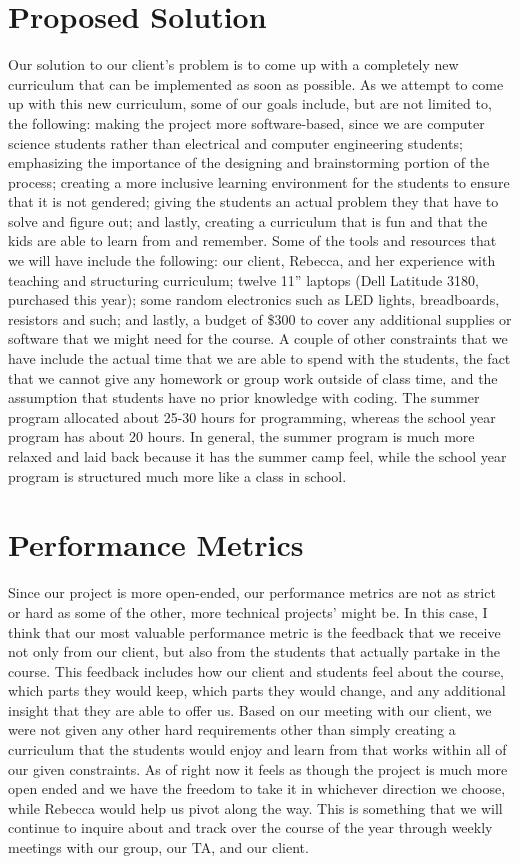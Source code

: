 \documentclass{article}
\begin{document}
\section{Proposed Solution}
Our solution to our client’s problem is to come up with a completely new curriculum that can be implemented as soon as possible. As we attempt to come up with this new curriculum, some of our goals include, but are not limited to, the following: making the project more software-based, since we are computer science students rather than electrical and computer engineering students; emphasizing the importance of the designing and brainstorming portion of the process; creating a more inclusive learning environment for the students to ensure that it is not gendered; giving the students an actual problem they that have to solve and figure out; and lastly, creating a curriculum that is fun and that the kids are able to learn from and remember. Some of the tools and resources that we will have include the following: our client, Rebecca, and her experience with teaching and structuring curriculum; twelve 11” laptops (Dell Latitude 3180, purchased this year); some random electronics such as LED lights, breadboards, resistors and such; and lastly, a budget of \$300 to cover any additional supplies or software that we might need for the course. A couple of other constraints that we have include the actual time that we are able to spend with the students, the fact that we cannot give any homework or group work outside of class time, and the assumption that students have no prior knowledge with coding. The summer program allocated about 25-30 hours for programming, whereas the school year program has about 20 hours. In general, the summer program is much more relaxed and laid back because it has the summer camp feel, while the school year program is structured much more like a class in school.

\section{Performance Metrics}
Since our project is more open-ended, our performance metrics are not as strict or hard as some of the other, more technical projects’ might be. In this case, I think that our most valuable performance metric is the feedback that we receive not only from our client, but also from the students that actually partake in the course. This feedback includes how our client and students feel about the course, which parts they would keep, which parts they would change, and any additional insight that they are able to offer us. Based on our meeting with our client, we were not given any other hard requirements other than simply creating a curriculum that the students would enjoy and learn from that works within all of our given constraints. As of right now it feels as though the project is much more open ended and we have the freedom to take it in whichever direction we choose, while Rebecca would help us pivot along the way. This is something that we will continue to inquire about and track over the course of the year through weekly meetings with our group, our TA, and our client.
\end{document}
